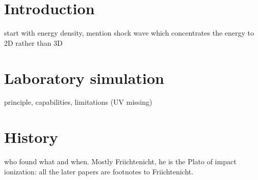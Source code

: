 \section{Introduction}

start with energy density, mention shock wave which concentrates the energy to 2D rather than 3D

\section{Laboratory simulation}

principle, capabilities, limitations (UV missing)

\section{History}

who found what and when. Mostly Friichtenicht, he is the Plato of impact ionization: all the later papers are footnotes to Friichtenicht. 











